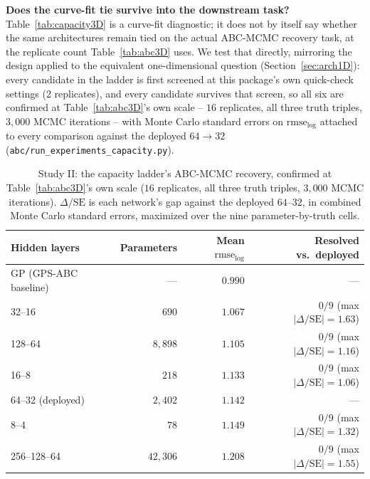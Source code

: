 \documentclass[sn-basic,iicol,pdflatex]{sn-jnl}
\begin{document}
\noindent\textbf{Does the curve-fit tie survive into the downstream task?} Table~\ref{tab:capacity3D}
is a curve-fit diagnostic; it does not by itself say whether the same
architectures remain tied on the actual ABC-MCMC recovery task, at the
replicate count Table~\ref{tab:abc3D} uses. We test that directly, mirroring
the design applied to the equivalent one-dimensional question
(Section~\ref{sec:arch1D}): every candidate in the ladder is first screened at
this package's own quick-check settings (2 replicates), and every candidate
survives that screen, so all six are confirmed at Table~\ref{tab:abc3D}'s own
scale -- $16$ replicates, all three truth triples, $3{,}000$ MCMC iterations --
with Monte Carlo standard errors on $\mathrm{rmse}_{\log}$ attached to every
comparison against the deployed $64\to32$
(\texttt{abc/run\_experiments\_capacity.py}).

\begin{table}[t]
\centering
\caption{Study II: the capacity ladder's ABC-MCMC recovery, confirmed at
Table~\ref{tab:abc3D}'s own scale ($16$ replicates, all three truth triples,
$3{,}000$ MCMC iterations). $\Delta/\mathrm{SE}$ is each network's gap against
the deployed $64$--$32$, in combined Monte Carlo standard errors, maximized
over the nine parameter-by-truth cells.}
\label{tab:capacity3D_abc}
\begin{tabular}{lrrr}
\toprule
Hidden layers & Parameters & Mean $\mathrm{rmse}_{\log}$ & Resolved vs.\ deployed \\
\midrule
GP (GPS-ABC baseline) & --- & $0.990$ & --- \\
32--16 & $690$ & $1.067$ & $0/9$ (max $|\Delta/\mathrm{SE}|=1.63$) \\
128--64 & $8{,}898$ & $1.105$ & $0/9$ (max $|\Delta/\mathrm{SE}|=1.16$) \\
16--8 & $218$ & $1.133$ & $0/9$ (max $|\Delta/\mathrm{SE}|=1.06$) \\
64--32 (deployed) & $2{,}402$ & $1.142$ & --- \\
8--4 & $78$ & $1.149$ & $0/9$ (max $|\Delta/\mathrm{SE}|=1.32$) \\
256--128--64 & $42{,}306$ & $1.208$ & $0/9$ (max $|\Delta/\mathrm{SE}|=1.55$) \\
\bottomrule
\end{tabular}
\end{table}
\end{document}
